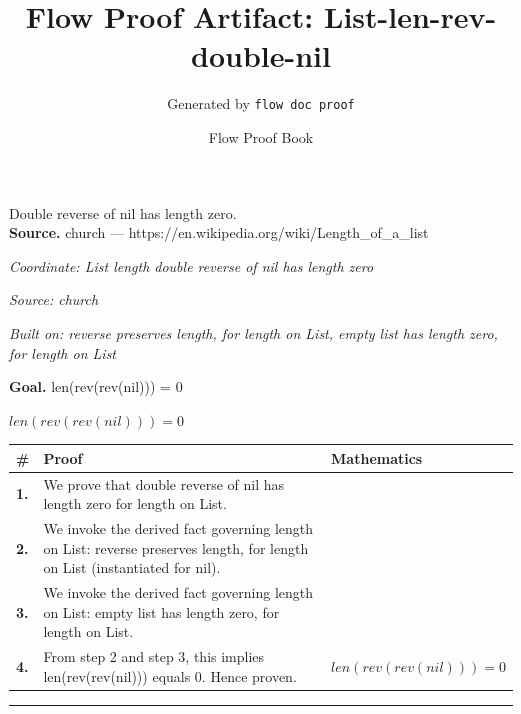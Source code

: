 \documentclass[11pt]{article}
\title{Flow Proof Artifact: List-len-rev-double-nil}
\author{Generated by \texttt{flow doc proof}}
\date{Flow Proof Book}
\theoremstyle{definition}
\begin{document}
\maketitle
Double reverse of nil has length zero.\\[0.5em]
\textbf{Source.} church — https://en.wikipedia.org/wiki/Length\_of\_a\_list\\[0.5em]
\bigskip
{}\par
\smallskip\noindent\textit{Coordinate: List \cdot length \cdot double reverse of nil has length zero}\par
\smallskip\noindent\textit{Source: church}\par
\smallskip\noindent\textit{Built on: reverse preserves length, for length on List, empty list has length zero, for length on List}\par
\medskip
\noindent\textbf{Goal.} len(rev(rev(nil))) = 0\par
\noindent$\displaystyle len(rev(rev(nil))) = 0$\par
\medskip
\noindent
\begin{tabular}{@{} >{\raggedright\arraybackslash}p{} >{\raggedright\arraybackslash}p{} >{\raggedleft\arraybackslash}p{} @{}}
\textbf{\#} & \textbf{Proof} & \textbf{Mathematics} \\
\midrule
\textbf{1.} & We prove that double reverse of nil has length zero for length on List. & \\[0.45em]
\textbf{2.} & We invoke the derived fact governing length on List: reverse preserves length, for length on List (instantiated for nil). & \\[0.45em]
\textbf{3.} & We invoke the derived fact governing length on List: empty list has length zero, for length on List. & \\[0.45em]
\textbf{4.} & From step 2 and step 3, this implies len(rev(rev(nil))) equals 0. Hence proven. & $\displaystyle len(rev(rev(nil))) = 0$ \\[0.45em]
\bottomrule
\end{tabular}
\label{thm:List-length-double_reverse_of_nil_has_length_zero}
\par\medskip\hrule
\end{document}
